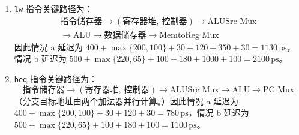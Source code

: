 \begin{problem}
\begin{solution}
\begin{enumerate}
            \item[\textbf{5)}] \texttt{lw} 指令关键路径为：
            $$
            \begin{gathered}
                \text{指令储存器} \to (\text{寄存器堆},\ \text{控制器}) \to \text{ALUSrc Mux} \\
                \to \text{ALU} \to \text{数据储存器} \to \text{MemtoReg Mux}
            \end{gathered}
            $$
            因此情况 a 延迟为 $400 + \max\{200, 100\} + 30 + 120 + 350 + 30 = 1130\,\mathrm{ps}$，情况 b 延迟为 $500 + \max\{220, 65\} + 100 + 180 + 1000 + 100 = 2100\,\mathrm{ps}$。

            \item[\textbf{6)}] \texttt{beq} 指令关键路径为：
            $$
            \text{指令储存器} \to (\text{寄存器堆},\ \text{控制器}) \to \text{ALUSrc Mux} \to \text{ALU} \to \text{PC Mux}
            $$
            （分支目标地址由两个加法器并行计算。）因此情况 a 延迟为 $400 + \max\{200, 100\} + 30 + 120 + 30 = 780\,\mathrm{ps}$，情况 b 延迟为 $500 + \max\{220, 65\} + 100 + 180 + 100 = 1100\,\mathrm{ps}$。
        \end{enumerate}
    \end{solution}
\end{problem}

